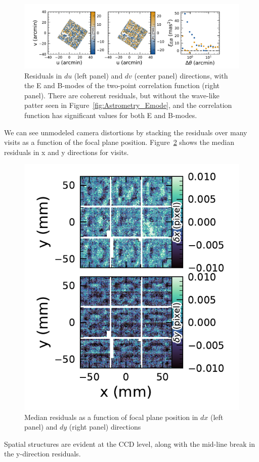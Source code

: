 \begin{figure}[htb!]
\centering
\includegraphics[width=0.98\linewidth]{Astrometry_2024120700527.pdf}
\caption{\small Residuals in $du$ (left panel) and $dv$ (center panel) directions, with the E and B-modes of the two-point correlation function (right panel). There are coherent residuals, but without the wave-like patter seen in Figure~\ref{fig:Astrometry_Emode}, and the correlation function has significant values for both E and B-modes.}
\label{fig:Astrometry_EBmode}
\vspace{0.1cm}
\end{figure}

We can see unmodeled camera distortions by stacking the residuals over many visits as a function of the focal plane position.
Figure~\ref{fig:Astrometry_FoV} shows the median residuals in x and y directions for \nvisits visits.
\begin{figure}[htb!]
\centering
\includegraphics[width=\linewidth]{Astrometry_FoV.pdf}
\caption{Median residuals as a function of focal plane position in $dx$ (left panel) and $dy$ (right panel) directions}
\label{fig:Astrometry_FoV}
\end{figure}
Spatial structures are evident at the CCD level, along with the mid-line break in the y-direction residuals.


